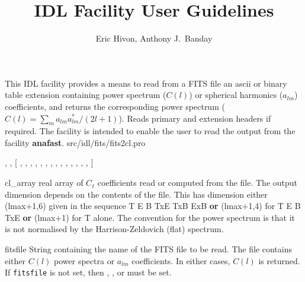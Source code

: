 

\sloppy

\title{\healpix IDL Facility User Guidelines}
 \section[fits2cl]{ }
\label{idl:fits2cl}
\author{Eric Hivon, Anthony J.~Banday}

\begin{facility}
{This IDL facility provides a means to
read from a FITS file an ascii or binary table extension containing power 
spectrum ($C(l)$) or spherical harmonics ($a_{l m}$) coefficients, and returns
the corresponding power spectrum ($C(l) = \sum_m a_{lm}a^*_{lm} / (2l+1)$). Reads primary and extension headers if
required. The facility is intended to enable the user to read the
output from the \healpix facility \textbf{anafast}.
}
{src/idl/fits/fits2cl.pro}
\end{facility}

\begin{IDLformat}
{\thedocid, 
, 
[%
, %
 ,
 ,
, 
, 
, 
,  
, 
, 
, 
, 
, 
, 
, 
%
]}
\end{IDLformat}

\begin{qualifiers}
  \begin{qulist}{} %
    \item[cl\_array] %
      real array of $C_\ell$ coefficients read or computed from the
      file. The output dimension depends on the contents of the file. 
	This has dimension either (lmax+1,6) given in the sequence T E B
      TxE TxB ExB {\bf or} (lmax+1,4) for T E B TxE {\bf or} (lmax+1) for T
    alone. 
     The convention for the power spectrum is that it is not
      normalised by the Harrison-Zeldovich (flat) spectrum.
%
    \item[fitsfile] %
    String containing the name of the FITS file to be read. The
    file contains either $C(l)$ power spectra or $a_{l m}$ coefficients. In either
    cases, $C(l)$ is returned. If {\tt fitsfile} is not set, then
,
,
 or
must be set.
  \end{qulist}
\end{qualifiers}

